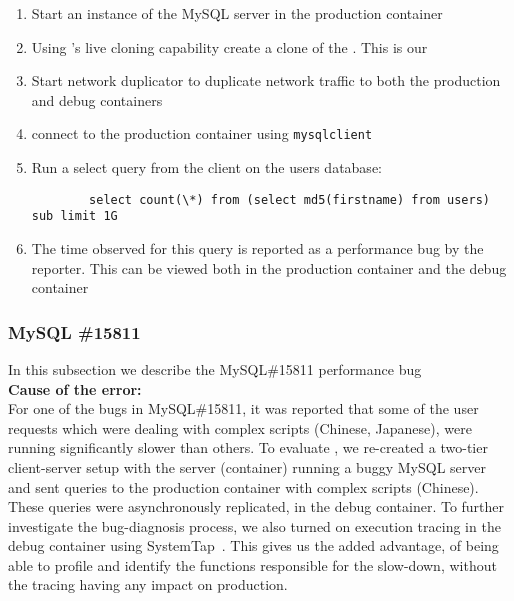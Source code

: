 \begin{adjustwidth}{0.5cm}{}
	\begin{enumerate}
		\item Start an instance of the MySQL server in the production container
		\item Using \parikshan's live cloning capability create a clone of the \productioncontainer. This is our \debugcontainer
		\item Start network duplicator to duplicate network traffic to both the production and debug containers
		\item connect to the production container using \texttt{mysqlclient}
		\item Run a select query from the client on the users database:
		
		\begin{lstlisting}
		select count(\*) from (select md5(firstname) from users) sub limit 1G
		\end{lstlisting}
		
		\item The time observed for this query is reported as a performance bug by the reporter. This can be viewed both in the production container and the debug container
		
	\end{enumerate}
\end{adjustwidth}	



\subsubsection{MySQL \#15811}
\label{sec:mySQL15811}

In this subsection we describe the MySQL\#15811 performance bug \\

\noindent \textbf{Cause of the error:} \\

For one of the bugs in  MySQL\#15811, it was reported that some of the user requests which were dealing with complex scripts (Chinese, Japanese), were running significantly slower than others.
To evaluate \parikshan, we re-created a two-tier client-server setup with the server (container) running a buggy MySQL server and sent queries to the production container with complex scripts (Chinese).
These queries were asynchronously replicated, in the debug container. To further investigate the bug-diagnosis process, we also turned on execution tracing in the debug container using SystemTap~\cite{systemtap}.
This gives us the added advantage, of being able to profile and identify the functions responsible for the slow-down, without the tracing having any impact on production.\\

